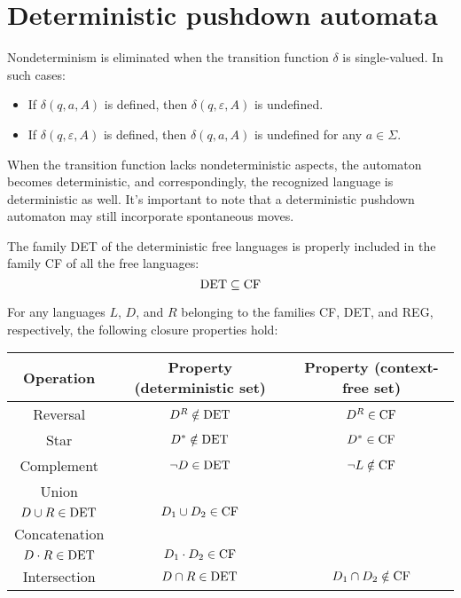 \section{Deterministic pushdown automata}

Nondeterminism is eliminated when the transition function $\delta$ is single-valued. 
In such cases:
\begin{itemize}
    \item If $\delta (q, a, A)$ is defined, then $\delta(q, \varepsilon, A)$ is undefined. 
    \item If $\delta(q, \varepsilon, A)$ is defined, then $\delta (q, a, A)$ is undefined for any $a \in \Sigma$.
\end{itemize}
When the transition function lacks nondeterministic aspects, the automaton becomes deterministic, and correspondingly, the recognized language is deterministic as well. 
It's important to note that a deterministic pushdown automaton may still incorporate spontaneous moves.

\begin{property}
    The family DET of the deterministic free languages is properly included in the family CF of all the free languages: 
    \[\textnormal{DET} \subseteq \textnormal{CF}\]
\end{property}

For any languages $L$, $D$, and $R$ belonging to the families CF, DET, and REG, respectively, the following closure properties hold:
\begin{table}[H]
    \centering
    \begin{tabular}{ccc}
    \hline
    \textbf{Operation} & \textbf{Property (deterministic set)}                                                & \textbf{Property (context-free set)}  \\ \hline
    Reversal           & $D^R \notin \textnormal{DET}$                                                        & $D^R \in \textnormal{CF}$             \\
    Star               & $D^{\ast} \notin \textnormal{DET}$                                                      & $D^{\ast} \in \textnormal{CF}$           \\
    Complement         & $\lnot D \in \textnormal{DET}$                                                       & $\lnot L \notin \textnormal{CF}$      \\
    Union              & \makecell{$D_1 \cup D_2 \notin \textnormal{DET}$ \\ $D \cup R \in \textnormal{DET}$}   & $D_1 \cup D_2 \in \textnormal{CF}$    \\
    Concatenation      & \makecell{$D_1 \cdot D_2 \notin \textnormal{DET}$ \\ $D \cdot R \in \textnormal{DET}$} & $D_1 \cdot D_2 \in \textnormal{CF}$   \\
    Intersection       & $D \cap R \in \textnormal{DET}$                                                      & $D_1 \cap D_2 \notin \textnormal{CF}$ \\ \hline
    \end{tabular}
\end{table}